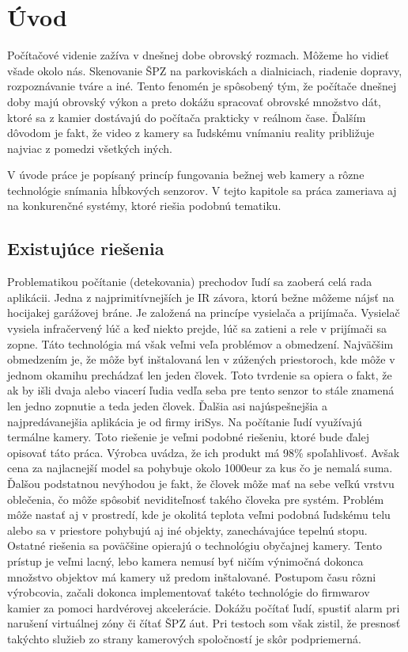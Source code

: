 
\chapter{Úvod}
Počítačové videnie zažíva v dnešnej dobe obrovský rozmach. Môžeme ho vidieť všade okolo nás. Skenovanie ŠPZ na parkoviskách a dialniciach,  riadenie dopravy, rozpoznávanie tváre a iné. Tento fenomén je spôsobený tým, že počítače dnešnej doby majú obrovský výkon a preto dokážu spracovať obrovské množstvo dát, ktoré sa z kamier dostávajú do počítača prakticky v reálnom čase. Ďalším dôvodom je fakt, že video z kamery sa ľudskému vnímaniu reality približuje najviac z pomedzi všetkých iných. 
	
V úvode práce je popísaný princíp fungovania bežnej web kamery a rôzne technológie snímania hĺbkových senzorov. V tejto kapitole sa práca zameriava aj na konkurenčné systémy, ktoré riešia podobnú tematiku.

\section{Existujúce riešenia}
Problematikou počítanie (detekovania) prechodov ľudí sa zaoberá celá rada aplikácii.  
Jedna z najprimitívnejších je IR závora, ktorú bežne môžeme nájsť na hocijakej garážovej bráne. Je založená na princípe vysielača a prijímača. Vysielač vysiela infračervený lúč a keď niekto prejde, lúč sa zatieni a rele v prijímači sa zopne. Táto technológia má však veľmi veľa problémov a obmedzení. Najväčšim obmedzením je, že môže byť inštalovaná len v zúžených priestoroch, kde môže v jednom okamihu prechádzať len jeden človek. Toto tvrdenie sa opiera o fakt, že ak by išli dvaja alebo viacerí ľudia vedľa seba pre tento senzor to stále znamená len jedno zopnutie a teda jeden človek.
Ďalšia asi najúspešnejšia a najpredávanejšia aplikácia je od firmy iriSys. Na počítanie ľudí využívajú termálne kamery. Toto riešenie je veľmi podobné riešeniu, ktoré bude ďalej opisovať táto práca. Výrobca uvádza, že ich produkt má 98\% spoľahlivosť. Avšak cena za najlacnejší model sa pohybuje okolo 1000eur za kus čo je nemalá suma. Ďalšou podstatnou nevýhodou je fakt, že človek môže mať na sebe veľkú vrstvu oblečenia, čo môže spôsobiť neviditeľnosť takého človeka pre systém. Problém môže nastať aj v prostredí, kde je okolitá teplota veľmi podobná ľudskému telu alebo sa v priestore pohybujú aj iné objekty, zanechávajúce tepelnú stopu.
Ostatné riešenia sa poväčšine opierajú o technológiu obyčajnej kamery. Tento prístup je veľmi lacný, lebo kamera nemusí byť ničím výnimočná dokonca množstvo objektov má kamery už  predom inštalované. Postupom času rôzni výrobcovia, začali dokonca implementovať takéto technológie do firmwarov kamier za pomoci hardvérovej akcelerácie. Dokážu počítať ľudí, spustiť alarm pri narušení virtuálnej zóny či čítať ŠPZ áut. Pri testoch som však zistil, že presnosť takýchto služieb zo strany kamerových spoločností je skôr podpriemerná. 


